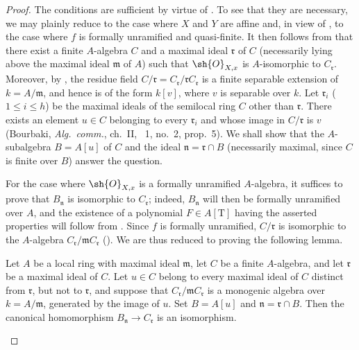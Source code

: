 \begin{proof}
The conditions are sufficient by virtue of .
To see that they are necessary, we may plainly reduce to the case where $X$ and $Y$ are affine and, in view of , to the case where $f$ is formally unramified and quasi-finite.
It then follows from  that there exist a finite $A$-algebra $C$ and a maximal ideal $\mathfrak{r}$ of $C$ (necessarily lying above the maximal ideal $\mathfrak{m}$ of $A$) such that $\sh{O}_{X,x}$ is $A$-isomorphic to $C_\mathfrak{r}$.
Moreover, by , the residue field $C/\mathfrak{r}=C_\mathfrak{r}/\mathfrak{r}C_\mathfrak{r}$ is a finite separable extension of $k=A/\mathfrak{m}$, and hence is of the form $k[v]$, where $v$ is separable over $k$.
Let $\mathfrak{r}_i$ ($1\leq i\leq h$) be the maximal ideals of the semilocal ring $C$ other than $\mathfrak{r}$.
There exists an element $u\in C$ belonging to every $\mathfrak{r}_i$ and whose image in $C/\mathfrak{r}$ is $v$ (Bourbaki, \emph{Alg.\ comm.}, ch.~II, \textsection~1, no.~2, prop.~5).
We shall show that the $A$-subalgebra $B=A[u]$ of $C$ and the ideal $\mathfrak{n}=\mathfrak{r}\cap B$ (necessarily maximal, since $C$ is finite over $B$) answer the question.

For the case where $\sh{O}_{X,x}$ is a formally unramified $A$-algebra, it suffices to prove that $B_\mathfrak{n}$ is isomorphic to $C_\mathfrak{r}$; indeed, $B_\mathfrak{n}$ will then be formally unramified over $A$, and the existence of a polynomial $F\in A[\mathrm{T}]$ having the asserted properties will follow from .
Since $f$ is formally unramified, $C/\mathfrak{r}$ is isomorphic to the $A$-algebra $C_\mathfrak{r}/\mathfrak{m}C_\mathfrak{r}$ ().
We are thus reduced to proving the following lemma.

\begin{lemma}[18.4.6.1]
\label{IV.18.4.6.1}
Let $A$ be a local ring with maximal ideal $\mathfrak{m}$, let $C$ be a finite $A$-algebra, and let $\mathfrak{r}$ be a maximal ideal of $C$.
Let $u\in C$ belong to every maximal ideal of $C$ distinct from $\mathfrak{r}$, but not to $\mathfrak{r}$, and suppose that $C_\mathfrak{r}/\mathfrak{m}C_\mathfrak{r}$ is a monogenic algebra over $k=A/\mathfrak{m}$, generated by the image of $u$.
Set $B=A[u]$ and $\mathfrak{n}=\mathfrak{r}\cap B$.
Then the canonical homomorphism $B_\mathfrak{n}\to C_\mathfrak{r}$ is an isomorphism.
\end{lemma}


\end{proof}
